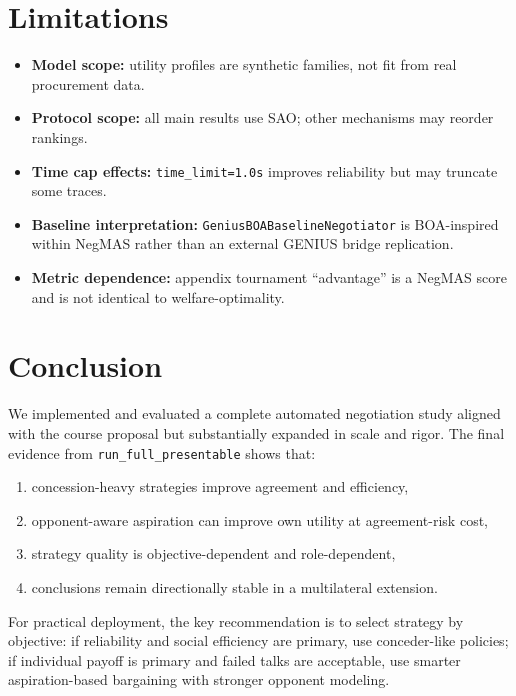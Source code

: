 \documentclass[11pt]{article}
\begin{document}
\section{Limitations}
\begin{itemize}[leftmargin=1.5em]
    \item \textbf{Model scope:} utility profiles are synthetic families, not fit from real procurement data.
    \item \textbf{Protocol scope:} all main results use SAO; other mechanisms may reorder rankings.
    \item \textbf{Time cap effects:} \texttt{time\_limit=1.0s} improves reliability but may truncate some traces.
    \item \textbf{Baseline interpretation:} \texttt{GeniusBOABaselineNegotiator} is BOA-inspired within NegMAS rather than an external GENIUS bridge replication.
    \item \textbf{Metric dependence:} appendix tournament ``advantage'' is a NegMAS score and is not identical to welfare-optimality.
\end{itemize}

\section{Conclusion}
We implemented and evaluated a complete automated negotiation study aligned with the course proposal but substantially expanded in scale and rigor. The final evidence from \texttt{run\_full\_presentable} shows that:
\begin{enumerate}[leftmargin=1.5em]
    \item concession-heavy strategies improve agreement and efficiency,
    \item opponent-aware aspiration can improve own utility at agreement-risk cost,
    \item strategy quality is objective-dependent and role-dependent,
    \item conclusions remain directionally stable in a multilateral extension.
\end{enumerate}

For practical deployment, the key recommendation is to select strategy by objective: if reliability and social efficiency are primary, use conceder-like policies; if individual payoff is primary and failed talks are acceptable, use smarter aspiration-based bargaining with stronger opponent modeling.
\end{document}
